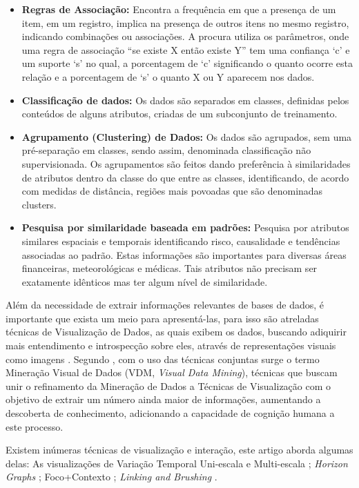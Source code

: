 \documentclass[article,11pt,oneside,a4paper]{abntex2} %
\begin{document}
	\begin{itemize}
	\item \textbf{Regras de Associação:} Encontra a frequência em que a presença de um item, em um registro, implica na presença de outros itens no mesmo registro, indicando combinações ou associações. A procura utiliza os parâmetros, onde uma regra de associação ``se existe X então existe Y'' tem uma confiança `c' e um suporte `s' no qual, a porcentagem de `c' significando o quanto ocorre esta relação e a porcentagem de `s' o quanto X ou Y aparecem nos dados.
	\item \textbf{Classificação de dados:} Os dados são separados em classes, definidas pelos conteúdos de alguns atributos, criadas de um subconjunto de treinamento.
	\item \textbf{Agrupamento (Clustering) de Dados:} Os dados são agrupados, sem uma pré-separação em classes, sendo assim, denominada classificação não supervisionada. Os agrupamentos são feitos dando preferência à similaridades de atributos dentro da classe do que entre as classes, identificando, de acordo com medidas de distância, regiões mais povoadas que são denominadas clusters.
	\item \textbf{Pesquisa por similaridade baseada em padrões:} Pesquisa por atributos similares espaciais e temporais identificando risco, causalidade e tendências associadas ao padrão. Estas informações são importantes para diversas áreas financeiras, meteorológicas e médicas. Tais atributos não precisam ser exatamente idênticos mas ter algum nível de similaridade.
	\end{itemize}
	
	Além da necessidade de extrair informações relevantes de bases de dados, é importante que exista um meio para apresentá-las, para isso são atreladas técnicas de Visualização de Dados, as quais exibem os dados, buscando adiquirir mais entendimento e introspecção sobre eles, através de representações visuais como imagens \cite{rhyne2003}. Segundo , com o uso das técnicas conjuntas surge o termo Mineração Visual de Dados (VDM, \textit{Visual Data Mining}), técnicas que buscam unir o refinamento da Mineração de Dados a Técnicas de Visualização com o objetivo de extrair um número ainda maior de informações, aumentando a descoberta de conhecimento, adicionando a capacidade de cognição humana a este processo.
	
	Existem inúmeras técnicas de visualização e interação, este artigo aborda algumas delas: As visualizações de Variação Temporal Uni-escala e Multi-escala \cite{shimabukuro}; \textit{Horizon Graphs} \cite{horizon}; Foco+Contexto \cite{do2005visualizacao}; \textit{Linking and Brushing} \cite{kosara2003interaction}.
	
\end{document}
